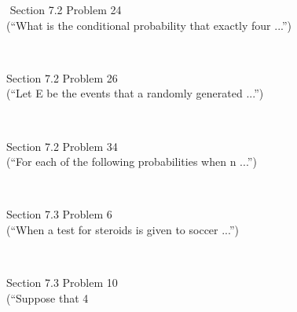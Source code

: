 \documentclass[11pt]{exam}
\begin{document}
\begin{questions}
\begin{solution}
\end{solution}$$
\question[2] Section 7.2 Problem 24\\
(“What is the conditional probability that exactly four ...”) 
\begin{solution}\\



\end{solution}
\question[2] Section 7.2 Problem 26\\
(“Let E be the events that a randomly generated ...”) 
\begin{solution}\\



\end{solution}
\question[4] Section 7.2 Problem 34\\
(“For each of the following probabilities when n ...”) 
\begin{solution}\\



\end{solution}
\question[2] Section 7.3 Problem 6\\
(“When a test for steroids is given to soccer ...”) 
\begin{solution}\\



\end{solution}
\question[6] Section 7.3 Problem 10\\
(“Suppose that 4%
\begin{solution}\\




\end{solution}
\end{questions}
\end{document}

